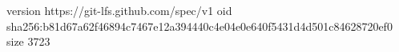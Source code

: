 version https://git-lfs.github.com/spec/v1
oid sha256:b81d67a62f46894c7467e12a394440c4e04e0e640f5431d4d501c84628720ef0
size 3723
